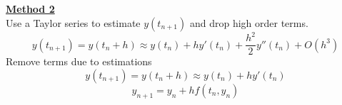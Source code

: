 \documentclass[12pt]{article}
\newcommand{\myt}[1]{\textbf{\underline{#1}}}
\begin{document}
	\myt{Method 2}\\
	Use a Taylor series to estimate $y(t_{n+1})$ and drop high order terms.\\
	$$y(t_{n+1}) = y(t_n + h) \approx y(t_n) + hy'(t_n) + \frac{h^2}{2}y''(t_n) + O(h^3)$$
	Remove terms due to estimations
	$$y(t_{n+1}) = y(t_n + h) \approx y(t_n) + hy'(t_n)$$
	$$y_{n+1} = y_n + hf(t_n, y_n)$$
	
	

	
	
	

	
	
	
	
	
\end{document}
